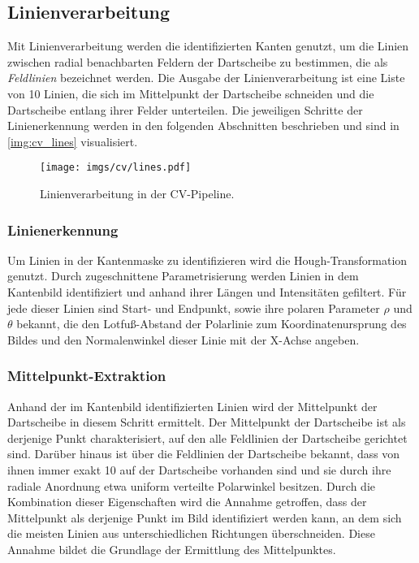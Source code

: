 \subsection{Linienverarbeitung}
\label{sec:impl:cv:lines}

Mit Linienverarbeitung werden die identifizierten Kanten genutzt, um die Linien zwischen radial benachbarten Feldern der Dartscheibe zu bestimmen, die als \textit{Feldlinien} bezeichnet werden. Die Ausgabe der Linienverarbeitung ist eine Liste von 10 Linien, die sich im Mittelpunkt der Dartscheibe schneiden und die Dartscheibe entlang ihrer Felder unterteilen. Die jeweiligen Schritte der Linienerkennung werden in den folgenden Abschnitten beschrieben und sind in \autoref{img:cv_lines} visualisiert.

\begin{figure}
    \centering
    \texttt{[image: imgs/cv/lines.pdf]}
    \caption{Linienverarbeitung in der CV-Pipeline.}
    \label{img:cv_lines}
\end{figure}

\subsubsection{Linienerkennung}
\label{sec:impl:cv:lines:erkennung}

Um Linien in der Kantenmaske zu identifizieren wird die Hough-Transformation genutzt. Durch zugeschnittene Parametrisierung werden Linien in dem Kantenbild identifiziert und anhand ihrer Längen und Intensitäten gefiltert. Für jede dieser Linien sind Start- und Endpunkt, sowie ihre polaren Parameter $\rho$ und $\theta$ bekannt, die den Lotfuß-Abstand der Polarlinie zum Koordinatenursprung des Bildes und den Normalenwinkel dieser Linie mit der X-Achse angeben.

\subsubsection{Mittelpunkt-Extraktion}
\label{sec:impl:cv:lines:midpoint}

Anhand der im Kantenbild identifizierten Linien wird der Mittelpunkt der Dartscheibe in diesem Schritt ermittelt. Der Mittelpunkt der Dartscheibe ist als derjenige Punkt charakterisiert, auf den alle Feldlinien der Dartscheibe gerichtet sind. Darüber hinaus ist über die Feldlinien der Dartscheibe bekannt, dass von ihnen immer exakt 10 auf der Dartscheibe vorhanden sind und sie durch ihre radiale Anordnung etwa uniform verteilte Polarwinkel besitzen. Durch die Kombination dieser Eigenschaften wird die Annahme getroffen, dass der Mittelpunkt als derjenige Punkt im Bild identifiziert werden kann, an dem sich die meisten Linien aus unterschiedlichen Richtungen überschneiden. Diese Annahme bildet die Grundlage der Ermittlung des Mittelpunktes.


